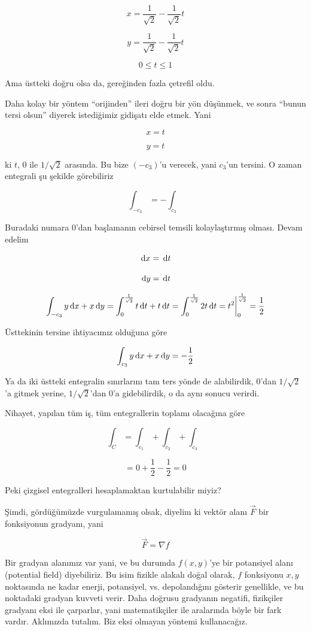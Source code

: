 \documentclass[12pt,fleqn]{article}\usepackage{../../common}
\begin{document}
$$ x = \frac{1}{\sqrt{2}} - \frac{1}{\sqrt{2}} t $$

$$ y = \frac{1}{\sqrt{2}} - \frac{1}{\sqrt{2}} t $$

$$ 0 \le t \le 1 $$

Ama üstteki doğru olsa da, gereğinden fazla çetrefil oldu. 

Daha kolay bir yöntem ``orijinden'' ileri doğru bir yön düşünmek, ve sonra
``bunun tersi olsun'' diyerek istediğimiz gidişatı elde etmek. Yani

$$ x = t $$

$$ y = t $$

ki $t$, 0 ile $1/\sqrt{2}$ arasında. Bu bize $(-c_3)$'u verecek, yani
$c_3$'un tersini. O zaman entegrali şu şekilde görebiliriz

$$ \int_{-c_3} = - \int_{c_3}  $$

Buradaki numara 0'dan başlamanın cebirsel temsili kolaylaştırmış
olması. Devam edelim

$$ \,\mathrm{d} x = \,\mathrm{d} t $$

$$ \,\mathrm{d} y = \,\mathrm{d} t $$

$$
\int_{-c_3} y \,\mathrm{d} x + x \,\mathrm{d} y  = 
\int_{0}^{\frac{1}{\sqrt{2}}} t \,\mathrm{d} t + t \,\mathrm{d} t = 
\int_{0}^{\frac{1}{\sqrt{2}}} 2t \,\mathrm{d} t = 
t^2 \bigg|_{0}^{\frac{1}{\sqrt{2}}} =
\frac{1}{2}
$$

Üsttekinin tersine ihtiyacımız olduğuna göre 

$$
\int_{c_3} y \,\mathrm{d} x + x \,\mathrm{d} y  = -\frac{1}{2}
$$

Ya da iki üstteki entegralin sınırlarını tam ters yönde de alabilirdik, 0'dan
$1/\sqrt{2}$'a gitmek yerine, $1/\sqrt{2}$'dan 0'a gidebilirdik, o da aynı
sonucu verirdi.

Nihayet, yapılan tüm iş, tüm entegrallerin toplamı olacağına göre

$$ \int_C = \int_{c_1} + \int_{c_2} + \int_{c_3}  $$

$$ = 0 + \frac{1}{2} - \frac{1}{2} = 0$$

Peki çizgisel entegralleri hesaplamaktan kurtulabilir miyiz? 

Şimdi, gördüğümüzde vurgulamamış olsak, diyelim ki vektör alanı $\vec{F}$
bir fonksiyonun gradyanı, yani

$$ \vec{F}  = \nabla f$$

Bir gradyan alanımız var yani, ve bu durumda $f(x,y)$'ye bir potansiyel alanı
(potential field) diyebiliriz. Bu isim fizikle alakalı doğal olarak, $f$
fonksiyonu $x,y$ noktasında ne kadar enerji, potansiyel, vs. depolandığını
gösterir genellikle, ve bu noktadaki gradyan kuvveti verir. Daha doğrusu
gradyanın negatifi, fizikçiler gradyanı eksi ile çarparlar, yani matematikçiler
ile aralarında böyle bir fark vardır. Aklımızda tutalım. Biz eksi olmayan
yöntemi kullanacağız.
\end{document}
